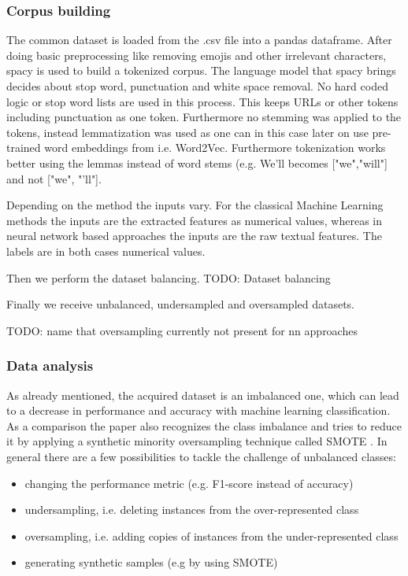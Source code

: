 \subsubsection{Corpus building}

The common dataset is loaded from the .csv file into a pandas dataframe. After doing basic preprocessing like removing emojis and other irrelevant characters, spacy is used to build a tokenized corpus. The language model that spacy brings decides about stop word, punctuation and white space removal. No hard coded logic or stop word lists are used in this process. This keeps URLs or other tokens including punctuation as one token. Furthermore no stemming was applied to the tokens, instead lemmatization was used as one can in this case later on use pre-trained word embeddings from i.e. Word2Vec. Furthermore tokenization works better using the lemmas instead of word stems (e.g. We'll becomes ["we","will"] and not ["we", "'ll"].



Depending on the method the inputs vary. For the classical Machine Learning methods the inputs are the extracted features as numerical values, whereas in neural network based approaches the inputs are the raw textual features. The labels are in both cases numerical values.

Then we perform the dataset balancing.
TODO: Dataset balancing


Finally we receive unbalanced, undersampled and oversampled datasets.

TODO: name that oversampling currently not present for nn approaches

\subsubsection{Data analysis} \label{sec:data_analysis}

As already mentioned, the acquired dataset is an imbalanced one, which can lead to a decrease in performance and accuracy with machine learning classification. As a comparison the paper \cite{Oriola2020} also recognizes the class imbalance and tries to reduce it by applying a synthetic minority oversampling technique called SMOTE \cite{Chawla2011}. In general there are a few possibilities to tackle the challenge of unbalanced classes:

\begin{itemize}
    \item changing the performance metric (e.g. F1-score instead of accuracy)
    \item undersampling, i.e. deleting instances from the over-represented class
    \item oversampling, i.e. adding copies of instances from the under-represented class
    \item generating synthetic samples (e.g by using SMOTE)
\end{itemize}

